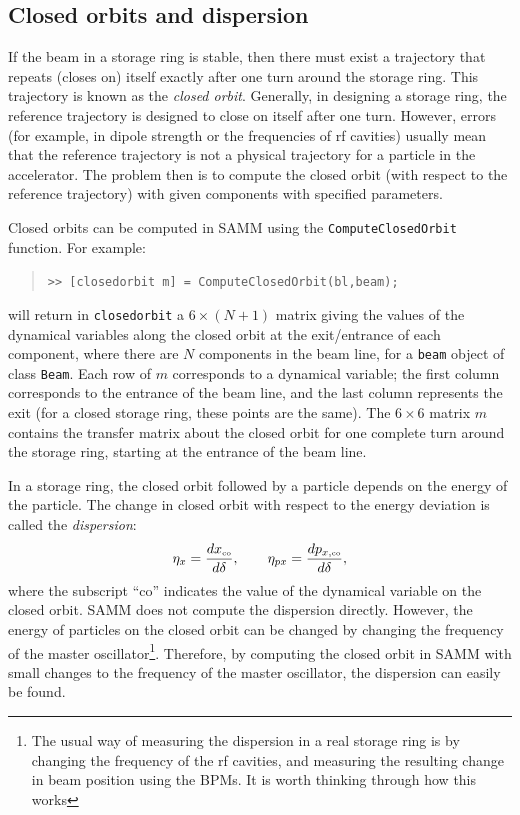 \documentclass[11pt,twoside,a4paper]{article}
\begin{document}
\subsection{Closed orbits and dispersion}
If the beam in a storage ring is stable, then there must exist a trajectory
that repeats (closes on) itself exactly after one turn around the storage ring.
This trajectory is known as the \emph{closed orbit}.  Generally, in designing
a storage ring, the reference trajectory is designed to close on itself after
one turn.  However, errors (for example, in dipole strength or the frequencies
of rf cavities) usually mean that the reference trajectory is not a physical
trajectory for a particle in the accelerator.  The problem then is to compute
the closed orbit (with respect to the reference trajectory) with given
components with specified parameters.

Closed orbits can be computed in SAMM using the \texttt{ComputeClosedOrbit}
function.  For example:
\begin{quote}
\texttt{>> [closedorbit m] = ComputeClosedOrbit(bl,beam);}
\end{quote}
will return in \texttt{closedorbit} a $6\times (N+1)$ matrix giving the
values of the dynamical variables along the closed orbit at the exit/entrance
of each component, where there are $N$ components in the beam line, for a
\texttt{beam} object of class \texttt{Beam}.  Each row of $m$
corresponds to a dynamical variable; the first column corresponds to the
entrance of the beam line, and the last column represents the exit (for a
closed storage ring, these points are the same).  The $6\times 6$ matrix
$m$ contains the transfer matrix about the closed orbit for one complete
turn around the storage ring, starting at the entrance of the beam line.

In a storage ring, the closed orbit followed by a particle depends on the
energy of the particle.  The change in closed orbit with respect to the
energy deviation is called the \emph{dispersion}:
\[
\eta_x = \frac{dx_\textrm{\tiny co}}{d\delta}, \qquad
\eta_{px} = \frac{dp_{x,\textrm{\tiny co}}}{d\delta},
\]
where the subscript ``co'' indicates the value of the dynamical variable
on the closed orbit.
SAMM does not compute the dispersion directly.  However, the energy of
particles on the closed orbit can be changed by changing the frequency
of the master oscillator\footnote{The usual way of measuring the dispersion
in a real storage ring is by changing the frequency of the rf cavities,
and measuring the resulting change in beam position using the BPMs.  It
is worth thinking through how this works}.  Therefore, by computing
the closed orbit in SAMM with small changes to the frequency of the
master oscillator, the dispersion can easily be found.
\end{document}
